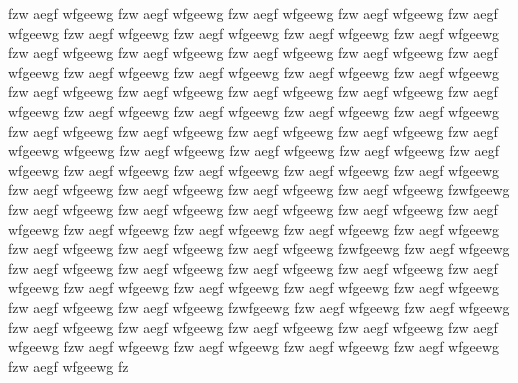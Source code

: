 		
		
		
		
		fzw aegf wfgeewg fzw aegf wfgeewg fzw aegf wfgeewg fzw aegf wfgeewg fzw aegf wfgeewg fzw aegf wfgeewg fzw aegf wfgeewg fzw aegf wfgeewg fzw aegf wfgeewg fzw aegf wfgeewg fzw aegf wfgeewg fzw aegf wfgeewg fzw aegf wfgeewg fzw aegf wfgeewg fzw aegf wfgeewg fzw aegf wfgeewg fzw aegf wfgeewg fzw aegf wfgeewg fzw aegf wfgeewg fzw aegf wfgeewg fzw aegf wfgeewg fzw aegf wfgeewg fzw aegf wfgeewg fzw aegf wfgeewg fzw aegf wfgeewg fzw aegf wfgeewg fzw aegf wfgeewg fzw aegf wfgeewg fzw aegf wfgeewg fzw aegf wfgeewg fzw aegf wfgeewg fzw aegf wfgeewg wfgeewg fzw aegf wfgeewg fzw aegf wfgeewg fzw aegf wfgeewg fzw aegf wfgeewg fzw aegf wfgeewg fzw aegf wfgeewg fzw aegf wfgeewg fzw aegf wfgeewg fzw aegf wfgeewg fzw aegf wfgeewg fzw aegf wfgeewg fzw aegf wfgeewg fzwfgeewg fzw aegf wfgeewg fzw aegf wfgeewg fzw aegf wfgeewg fzw aegf wfgeewg fzw aegf wfgeewg fzw aegf wfgeewg fzw aegf wfgeewg fzw aegf wfgeewg fzw aegf wfgeewg fzw aegf wfgeewg fzw aegf wfgeewg fzw aegf wfgeewg fzwfgeewg fzw aegf wfgeewg fzw aegf wfgeewg fzw aegf wfgeewg fzw aegf wfgeewg fzw aegf wfgeewg fzw aegf wfgeewg fzw aegf wfgeewg fzw aegf wfgeewg fzw aegf wfgeewg fzw aegf wfgeewg fzw aegf wfgeewg fzw aegf wfgeewg fzwfgeewg fzw aegf wfgeewg fzw aegf wfgeewg fzw aegf wfgeewg fzw aegf wfgeewg fzw aegf wfgeewg fzw aegf wfgeewg fzw aegf wfgeewg fzw aegf wfgeewg fzw aegf wfgeewg fzw aegf wfgeewg fzw aegf wfgeewg fzw aegf wfgeewg fz

		
	